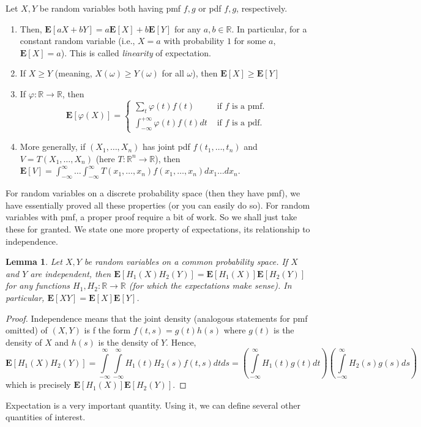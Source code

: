 \documentclass[preprint,  11pt]{amsart}
\newcommand{\para}[1]{\vspace{4mm}\noindent{\bfseries #1:}}
\theoremstyle{plain} %
\newtheorem{lemma}[theorem]{Lemma}
\theoremstyle{definition} %
\begin{document}
\para{Properties of expectation} Let $X,Y$ be random variables both having pmf $f,g$ or  pdf $f,g$, respectively. 
\begin{enumerate}\setlength\itemsep{6pt}
\item Then, $\mathbf{E}[aX+bY]=a\mathbf{E}[X]+b\mathbf{E}[Y]$ for any $a,b\in \mathbb{R}$. In particular, for a constant random variable (i.e., $X=a$ with probability $1$ for some $a$, $\mathbf{E}[X]=a$). This is called {\em linearity} of expectation.
\item If $X\ge Y$ (meaning, $X(\omega)\ge Y(\omega)$ for all $\omega$), then $\mathbf{E}[X]\ge \mathbf{E}[Y]$
\item If $\varphi:\mathbb{R}\rightarrow \mathbb{R}$, then $$\mathbf{E}[\varphi(X)]= \begin{cases}
\sum\limits_{t}\varphi(t)f(t) & \mbox{ if $f$ is a pmf}. \\
\int_{-\infty}^{+\infty}\varphi(t)f(t) dt & \mbox{ if $f$ is a pdf}.
\end{cases}
$$
\item More generally, if $(X_{1},\ldots ,X_{n})$ has joint pdf $f(t_{1},\ldots ,t_{n})$ and $V=T(X_{1},\ldots ,X_{n})$ (here $T:\mathbb{R}^{n}\rightarrow \mathbb{R}$), then $\mathbf{E}[V]=\int_{-\infty}^{\infty}\ldots \int_{-\infty}^{\infty}T(x_{1},\ldots ,x_{n})f(x_{1},\ldots ,x_{n})dx_{1}\ldots dx_{n}$. 
\end{enumerate}
For random variables on a discrete probability space (then they have  pmf), we have essentially proved all these properties (or you can easily do so). For random variables with pmf, a proper proof require a bit of work. So we shall just take these for granted.
%
We state one more property of expectations, its relationship to independence.
\begin{lemma} Let $X,Y$ be random variables on a common probability space. If $X$ and $Y$ are independent, then $\mathbf{E}[H_{1}(X)H_{2}(Y)]=\mathbf{E}[H_{1}(X)]\mathbf{E}[H_{2}(Y)]$ for any functions $H_{1},H_{2}:\mathbb{R}\rightarrow \mathbb{R}$ (for which the expectations make sense). In particular, $\mathbf{E}[XY]=\mathbf{E}[X]\mathbf{E}[Y]$. 
\end{lemma}
\begin{proof} Independence means that the joint density (analogous statements for pmf omitted) of $(X,Y)$ is f the form $f(t,s)=g(t)h(s)$ where $g(t)$ is the density of $X$ and $h(s)$ is the density of $Y$. Hence, 
$$
\mathbf{E}[H_{1}(X)H_{2}(Y)]=\int\limits_{-\infty}^{\infty}\!\!\int\limits_{-\infty}^{\infty} H_{1}(t)H_{2}(s) f(t,s)dt ds = \left(\int\limits_{-\infty}^{\infty} H_{1}(t)g(t) dt \right)\left(\int\limits_{-\infty}^{\infty} H_{2}(s)g(s) ds \right)
$$
which is precisely $\mathbf{E}[H_{1}(X)]\mathbf{E}[H_{2}(Y)]$.
\end{proof}
Expectation is a very important quantity. Using it, we can define several other quantities of interest.
\end{document}
